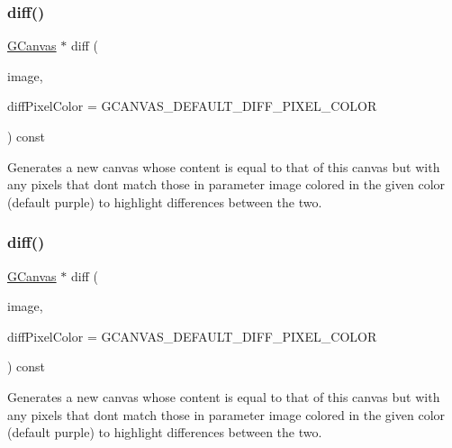 \subsubsection{\texorpdfstring{diff()}{diff()}\hspace{0.1cm}{\footnotesize\ttfamily [1/2]}}
{\footnotesize\ttfamily \mbox{\hyperlink{classsgl_1_1GCanvas}{G\+Canvas}} $\ast$ diff (\begin{DoxyParamCaption}\item[{const \mbox{\hyperlink{classsgl_1_1GCanvas}{G\+Canvas}} \&}]{image,  }\item[{int}]{diff\+Pixel\+Color = {\ttfamily GCANVAS\+\_\+DEFAULT\+\_\+DIFF\+\_\+PIXEL\+\_\+COLOR} }\end{DoxyParamCaption}) const\hspace{0.3cm}{\ttfamily [virtual]}}



Generates a new canvas whose content is equal to that of this canvas but with any pixels that don\textquotesingle{}t match those in parameter \textquotesingle{}image\textquotesingle{} colored in the given color (default purple) to highlight differences between the two. 

\mbox{\label{classsgl_1_1GCanvas_a5385d5c8fda55dfe0b20851d293b338b}} 
\subsubsection{\texorpdfstring{diff()}{diff()}\hspace{0.1cm}{\footnotesize\ttfamily [2/2]}}
{\footnotesize\ttfamily \mbox{\hyperlink{classsgl_1_1GCanvas}{G\+Canvas}} $\ast$ diff (\begin{DoxyParamCaption}\item[{const \mbox{\hyperlink{classsgl_1_1GCanvas}{G\+Canvas}} $\ast$}]{image,  }\item[{int}]{diff\+Pixel\+Color = {\ttfamily GCANVAS\+\_\+DEFAULT\+\_\+DIFF\+\_\+PIXEL\+\_\+COLOR} }\end{DoxyParamCaption}) const\hspace{0.3cm}{\ttfamily [virtual]}}



Generates a new canvas whose content is equal to that of this canvas but with any pixels that don\textquotesingle{}t match those in parameter \textquotesingle{}image\textquotesingle{} colored in the given color (default purple) to highlight differences between the two. 


